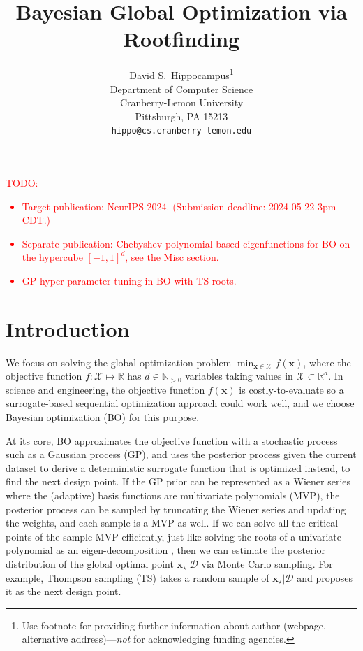 \documentclass{article}
\title{Bayesian Global Optimization via Rootfinding}
\author{%
  David S.~Hippocampus\thanks{Use footnote for providing further information
    about author (webpage, alternative address)---\emph{not} for acknowledging
    funding agencies.} \\
  Department of Computer Science\\
  Cranberry-Lemon University\\
  Pittsburgh, PA 15213 \\
  \texttt{hippo@cs.cranberry-lemon.edu} \\
}
\begin{document}
\maketitle


\begin{abstract}
\end{abstract}

\textcolor{red}{TODO:
\begin{itemize}
\item
  Target publication: NeurIPS 2024. (Submission deadline: 2024-05-22 3pm
  CDT.)
\item
  Separate publication: Chebyshev polynomial-based eigenfunctions for BO
  on the hypercube $[-1, 1]^d$, see the Misc section.
\item
  GP hyper-parameter tuning in BO with TS-roots.
\end{itemize}
}

\section{Introduction}

We focus on solving the global optimization
problem $\min_{\mathbf{x} \in \mathcal{X}} f(\mathbf{x})$, where the
objective function $f: \mathcal{X} \mapsto \mathbb{R}$ has
$d \in \mathbb{N}_{>0}$ variables taking values in
$\mathcal{X} \subset \mathbb{R}^d$.
In science and engineering, the objective function
$f(\mathbf{x})$ is costly-to-evaluate so a surrogate-based sequential
optimization approach could work well, and we choose Bayesian
optimization (BO) \cite{Garnett2023} for this purpose.

At its core, BO approximates the objective function with a stochastic
process such as a Gaussian process (GP), and uses the posterior process
given the current dataset to derive a deterministic surrogate function
that is optimized instead, to find the next design point. If the GP
prior can be represented as a Wiener series where the (adaptive) basis
functions are multivariate polynomials (MVP), the posterior process can
be sampled by truncating the Wiener series and updating the weights, and
each sample is a MVP as well. If we can solve all the critical points of
the sample MVP efficiently, just like solving the roots of a univariate
polynomial as an eigen-decomposition \cite{Trefethen2019}, then we can
estimate the posterior distribution of the global optimal point
$\mathbf{x}_\star|\mathcal{D}$ via Monte Carlo sampling. For example,
Thompson sampling (TS) takes a random sample of
$\mathbf{x}_\star|\mathcal{D}$ and proposes it as the next design
point.
\end{document}

